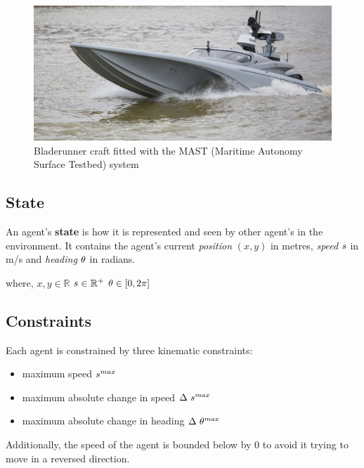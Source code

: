 \documentclass[bsc,frontabs,twoside,singlespacing,parskip,deptreport]{infthesis}     %
\begin{document}
\begin{figure}
    \centering
    \includegraphics[width=\linewidth]{report/images/usv.jpg}
    \caption{Bladerunner craft fitted with the MAST (Maritime Autonomy Surface Testbed) system}
    \label{fig:my_label}
\end{figure}

\subsection{State}
\label{ss:state}
An agent's \textbf{state} is how it is represented and seen by other agent's in the environment. It contains the agent's current \emph{position} $(x, y)$ in metres, \emph{speed} $s$ in m/s and \emph{heading} $\theta$ in radians.

where,
\hspace{0.5in}$x, y \in \mathbb{R}$
\hspace{0.5in}$s \in \mathbb{R^+}$
\hspace{0.5in}$ \theta \in [0, 2\pi]$

\subsection{Constraints}
\label{ss:constraints}
Each agent is constrained by three kinematic constraints:
\begin{itemize}
    \item maximum speed $s^{max}$
    \item maximum absolute change in speed $\Delta~s^{max}$ 
    \item maximum absolute change in heading $\Delta~\theta^{max}$
\end{itemize}
Additionally, the speed of the agent is bounded below by 0 to avoid it trying to move in a reversed direction.
\end{document}
